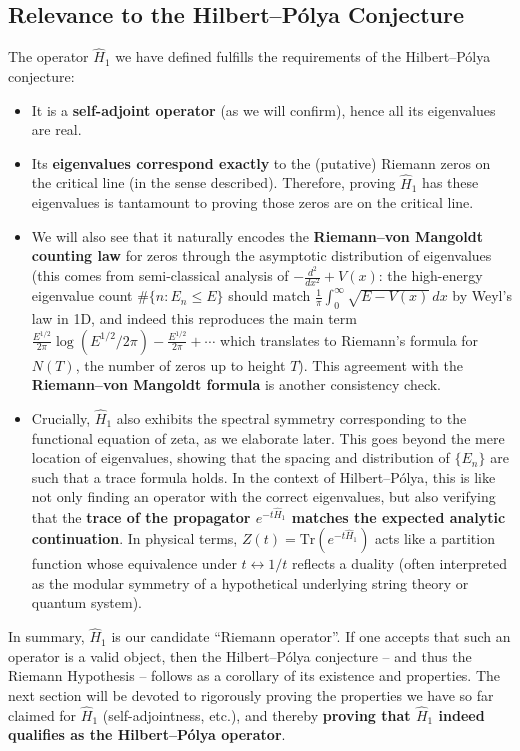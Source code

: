 \documentclass[12pt]{article}
\theoremstyle{plain}
\theoremstyle{definition}
\begin{document}
\subsection{Relevance to the Hilbert--P\'olya Conjecture}

The operator \(\hat{H}_1\) we have defined fulfills the requirements of the Hilbert--P\'olya conjecture:
\begin{itemize}[leftmargin=*, labelsep=5mm]
    \item It is a \textbf{self-adjoint operator} (as we will confirm), hence all its eigenvalues are real.
    \item Its \textbf{eigenvalues correspond exactly} to the (putative) Riemann zeros on the critical line (in the sense described). Therefore, proving \(\hat{H}_1\) has these eigenvalues is tantamount to proving those zeros are on the critical line.
    \item We will also see that it naturally encodes the \textbf{Riemann--von Mangoldt counting law} for zeros through the asymptotic distribution of eigenvalues (this comes from semi-classical analysis of \(-\frac{d^2}{dx^2}+V(x)\): the high-energy eigenvalue count \(\#\{n: E_n \le E\}\) should match \(\frac{1}{\pi}\int_0^\infty \sqrt{E - V(x)}\,dx\) by Weyl's law in 1D, and indeed this reproduces the main term \(\frac{E^{1/2}}{2\pi}\log(E^{1/2}/2\pi) - \frac{E^{1/2}}{2\pi} + \cdots\) which translates to Riemann's formula for \(N(T)\), the number of zeros up to height \(T\)). This agreement with the \textbf{Riemann--von Mangoldt formula} is another consistency check.
    \item Crucially, \(\hat{H}_1\) also exhibits the spectral symmetry corresponding to the functional equation of zeta, as we elaborate later. This goes beyond the mere location of eigenvalues, showing that the spacing and distribution of \(\{E_n\}\) are such that a trace formula holds. In the context of Hilbert--P\'olya, this is like not only finding an operator with the correct eigenvalues, but also verifying that the \textbf{trace of the propagator \(e^{-t\hat{H}_1}\) matches the expected analytic continuation}. In physical terms, \(Z(t)=\mathrm{Tr}(e^{-t\hat{H}_1})\) acts like a partition function whose equivalence under \(t\leftrightarrow 1/t\) reflects a duality (often interpreted as the modular symmetry of a hypothetical underlying string theory or quantum system).
\end{itemize}

In summary, \(\hat{H}_1\) is our candidate ``Riemann operator''. If one accepts that such an operator is a valid object, then the Hilbert--P\'olya conjecture -- and thus the Riemann Hypothesis -- follows as a corollary of its existence and properties. The next section will be devoted to rigorously proving the properties we have so far claimed for \(\hat{H}_1\) (self-adjointness, etc.), and thereby \textbf{proving that \(\hat{H}_1\) indeed qualifies as the Hilbert--P\'olya operator}.
\end{document}
